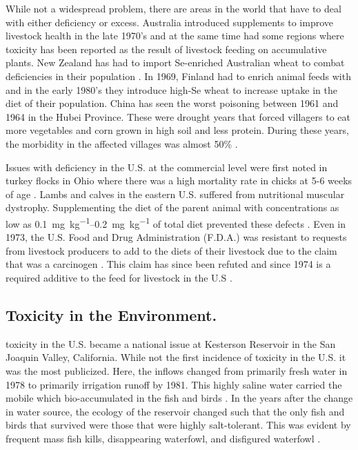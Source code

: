 \begin{linenumbers}[1]
While not a widespread problem, there are areas in the world that have to deal with either \Se deficiency or excess.  Australia introduced \Se supplements to improve livestock health in the late 1970's and at the same time had some regions where \Se toxicity has been reported as the result of livestock feeding on \Se accumulative plants.  New Zealand has had to import Se-enriched Australian wheat to combat \Se deficiencies in their population \parencite{1996Thomson,Tinggi2003}.  In 1969, Finland had to enrich animal feeds with \Se and in the early 1980's they introduce high-Se wheat to increase \Se uptake in the diet of their population.  China has seen the worst \Se poisoning between 1961 and 1964 in the Hubei Province.  These were drought years that forced villagers to eat more vegetables and corn grown in high \Se soil and less protein.  During these years, the morbidity in the affected villages was almost 50\% \parencite{yang1983}.

Issues with \Se deficiency in the U.S. at the commercial level were first noted in turkey flocks in Ohio where there was a high mortality rate in chicks at 5-6 weeks of age \parencite{scott1967}.  Lambs and calves in the eastern U.S. suffered from nutritional muscular dystrophy.  Supplementing the diet of the parent animal with \Se concentrations as low as \SIrange{0.1}{0.2}{\milli\g\per\kilo\g} of total diet prevented these defects .  Even in 1973, the U.S. Food and Drug Administration (F.D.A.) was resistant to requests from livestock producers to add \Se to the diets of their livestock due to the claim that \Se was a carcinogen \parencite{scott1973}.  This claim has since been refuted and since 1974 \Se is a required additive to the feed for livestock in the U.S \parencite{1999Jensen}.

\subsection*{\Se Toxicity in the Environment.}
\Se toxicity in the U.S. became a national issue at Kesterson Reservoir in the San Joaquin Valley, California.  While not the first incidence of \Se toxicity in the U.S. it was the most publicized.  Here, the inflows changed from primarily fresh water in 1978 to primarily irrigation runoff by 1981.  This highly saline water carried the mobile \selenate which bio-accumulated in the fish and birds \parencite{Besser1989}.  In the years after the change in water source, the ecology of the reservoir changed such that the only fish and birds that survived were those that were highly salt-tolerant.  This was evident by frequent mass fish kills, disappearing waterfowl, and disfigured waterfowl \parencite{Clifton1989,Saiki1993,Hamilton1999,Lemly2002}.


\end{linenumbers}
